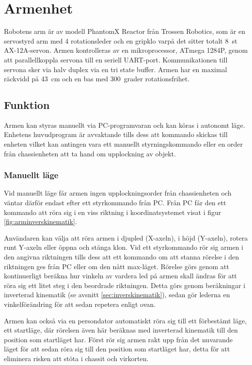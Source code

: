 \section{Armenhet}

Robotens arm är av modell PhantomX Reactor från Trossen Robotics, som är en servostyrd arm med 4 rotationsleder och en gripklo varpå det sitter totalt 8~st AX-12A-servon. Armen kontrolleras av en mikroprocessor, ATmega 1284P, genom att parallellkoppla servona till en seriell UART-port. Kommunikationen till servona sker via halv duplex via en tri state buffer. Armen har en maximal räckvidd på 43~cm och en bas med  300~grader rotationsfrihet.

\subsection{Funktion}

Armen kan styras manuellt via PC-programvaran och kan köras i autonomt läge. Enhetens huvudprogram är avvaktande tills dess att kommando skickas till enheten vilket kan antingen vara ett manuellt styrningskommando eller en order från chassienheten att ta hand om upplockning av objekt.

\subsubsection{Manuellt läge} 

Vid manuellt läge får armen ingen upplockningsorder från chassienheten och väntar därför endast efter ett styrkommando från PC. Från PC får den ett kommando att röra sig i en viss riktning i koordinatsystemet visat i figur \ref{fig:arminverskinematik}.

Användaren kan välja att röra armen i djupled (X-axeln), i höjd (Y-axeln), rotera runt Y-axeln eller öppna och stänga klon. Vid ett styrkommando rör sig armen i den angivna riktningen tills dess att ett kommando om att stanna rörelse i den riktningen ges från PC eller om den nått max-läget. Rörelse görs genom att kontinuerligt beräkna hur vinkeln av vardera led på armen skall ändras för att röra sig ett litet steg i den beordrade riktningen. Detta görs genom beräkningar i inverterad kinematik (se avsnitt \ref{sec:inverskinematik}), sedan gör lederna en vinkelförändring för att sedan repetera enligt ovan.

Armen kan också via en persondator automatiskt röra sig till ett förbestämt läge, ett startläge, där rörelsen även här beräknas med inverterad kinematik till den position som startläget har. Först rör sig armen rakt upp från det nuvarande läget för att sedan röra sig till den position som startläget har, detta för att eliminera risken att stöta i chassit och virkorten.

